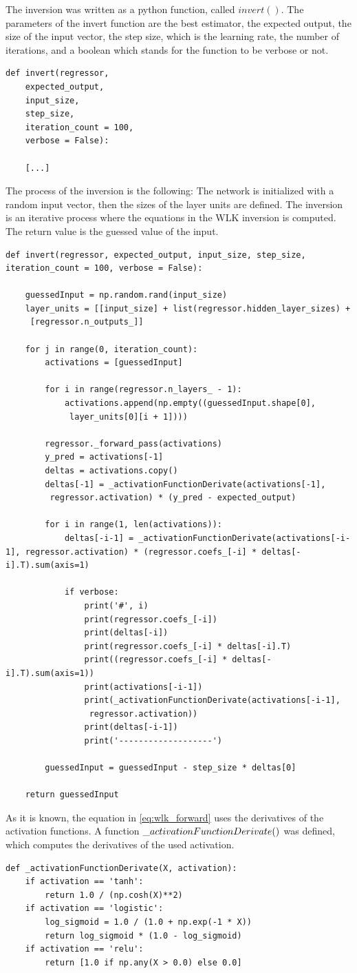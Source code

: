 The inversion was written as a python function, called $invert()$. The parameters of the invert function are the best estimator, the expected output, the size of the input vector, the step size, which is the learning rate, the number of iterations, and a boolean which stands for the function to be verbose or not.
\begin{lstlisting}
def invert(regressor, 
	expected_output, 
	input_size, 
	step_size, 
	iteration_count = 100, 
	verbose = False):

	[...]
\end{lstlisting}
The process of the inversion is the following: The network is initialized with a random input vector, then the sizes of the layer units are defined. The inversion is an iterative process where the equations in the WLK inversion is computed. The return value is the guessed value of the input.
\begin{lstlisting}
def invert(regressor, expected_output, input_size, step_size, iteration_count = 100, verbose = False):

	guessedInput = np.random.rand(input_size)
	layer_units = [[input_size] + list(regressor.hidden_layer_sizes) +
	 [regressor.n_outputs_]]
	
	for j in range(0, iteration_count):
		activations = [guessedInput]

		for i in range(regressor.n_layers_ - 1):
			activations.append(np.empty((guessedInput.shape[0],
			 layer_units[0][i + 1])))

		regressor._forward_pass(activations)
		y_pred = activations[-1]
		deltas = activations.copy()
		deltas[-1] = _activationFunctionDerivate(activations[-1],
		 regressor.activation) * (y_pred - expected_output)

		for i in range(1, len(activations)):
			deltas[-i-1] = _activationFunctionDerivate(activations[-i-1], regressor.activation) * (regressor.coefs_[-i] * deltas[-i].T).sum(axis=1)
			
			if verbose:
				print('#', i)
				print(regressor.coefs_[-i])
				print(deltas[-i])
				print(regressor.coefs_[-i] * deltas[-i].T)
				print((regressor.coefs_[-i] * deltas[-i].T).sum(axis=1))
				print(activations[-i-1])
				print(_activationFunctionDerivate(activations[-i-1],
				 regressor.activation))
				print(deltas[-i-1])
				print('-------------------')

		guessedInput = guessedInput - step_size * deltas[0]

	return guessedInput
\end{lstlisting}
As it is known, the equation in \eqref{eq:wlk_forward} uses the derivatives of the activation functions. A function $\char`_activationFunctionDerivate()$ was defined, which computes the derivatives of the used activation.
\begin{lstlisting}
def _activationFunctionDerivate(X, activation):
	if activation == 'tanh':
		return 1.0 / (np.cosh(X)**2)
	if activation == 'logistic':
		log_sigmoid = 1.0 / (1.0 + np.exp(-1 * X))
		return log_sigmoid * (1.0 - log_sigmoid)
	if activation == 'relu':
		return [1.0 if np.any(X > 0.0) else 0.0]
\end{lstlisting}

